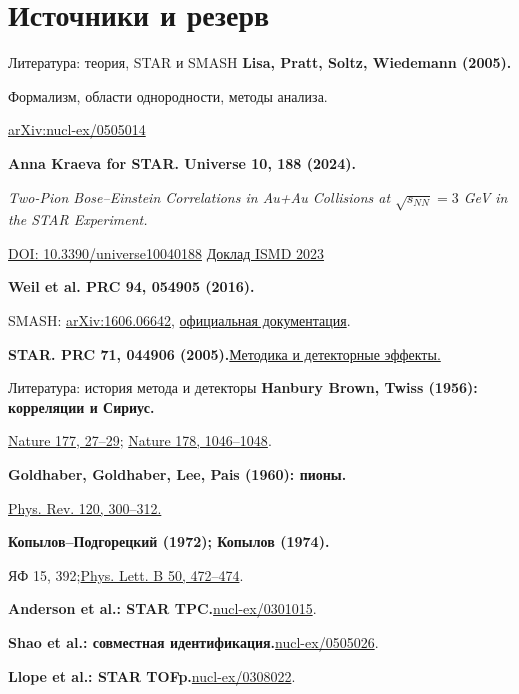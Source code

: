 \documentclass[aspectratio=169,12pt,professionalfonts]{beamer}
\newcommand{\slidenote}[1]{\note{}}
\begin{document}
\section{Источники и резерв}
\begin{frame}{Литература: теория, STAR и SMASH}
\small
\textbf{Lisa, Pratt, Soltz, Wiedemann (2005).}\par
Формализм, области однородности, методы анализа.\par
\href{https://arxiv.org/abs/nucl-ex/0505014}{arXiv:nucl-ex/0505014}\par\vspace{2mm}
\textbf{Anna Kraeva for STAR. Universe 10, 188 (2024).}\par
\emph{Two-Pion Bose–Einstein Correlations in Au+Au Collisions at $\sqrt{s_{NN}}=3$ GeV in the STAR Experiment.}\par
\href{https://doi.org/10.3390/universe10040188}{DOI: 10.3390/universe10040188}\quad
\href{https://indico.cern.ch/event/1258038/contributions/5537099/attachments/2700455/4687127/ISMD_2023_v6.pdf}{Доклад ISMD 2023}\par\vspace{2mm}
\textbf{Weil et al. PRC 94, 054905 (2016).}\par
SMASH: \href{https://arxiv.org/abs/1606.06642}{arXiv:1606.06642},
\href{https://smash-transport.github.io/}{официальная документация}.\par\vspace{2mm}
\textbf{STAR. PRC 71, 044906 (2005).}\quad\href{https://arxiv.org/abs/nucl-ex/0411036}{Методика и детекторные эффекты.}

\slidenote{31}
\end{frame}
\begin{frame}{Литература: история метода и детекторы}
\small
\textbf{Hanbury Brown, Twiss (1956): корреляции и Сириус.}\par
\href{https://doi.org/10.1038/177027a0}{Nature 177, 27–29};\quad
\href{https://doi.org/10.1038/1781046a0}{Nature 178, 1046–1048}.\par\vspace{2mm}
\textbf{Goldhaber, Goldhaber, Lee, Pais (1960): пионы.}\par
\href{https://doi.org/10.1103/PhysRev.120.300}{Phys. Rev. 120, 300–312.}\par\vspace{2mm}
\textbf{Копылов–Подгорецкий (1972); Копылов (1974).}\par
ЯФ 15, 392;\quad\href{https://doi.org/10.1016/0370-2693(74)90263-9}{Phys. Lett. B 50, 472–474}.\par\vspace{2mm}
\textbf{Anderson et al.: STAR TPC.}\quad\href{https://arxiv.org/abs/nucl-ex/0301015}{nucl-ex/0301015}.\par
\textbf{Shao et al.: совместная идентификация.}\quad\href{https://arxiv.org/abs/nucl-ex/0505026}{nucl-ex/0505026}.\par
\textbf{Llope et al.: STAR TOFp.}\quad\href{https://arxiv.org/abs/nucl-ex/0308022}{nucl-ex/0308022}.

\slidenote{32}
\end{frame}
\end{document}
